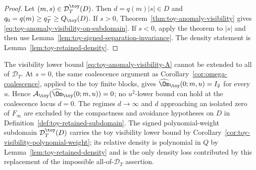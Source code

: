 \begin{proof}
Let \((m,s)\in\mathcal D_T^\toy(D)\).  Then
\(d=q(m)|s|\in D\) and \(q_0=q(m)\ge q_T^-\ge Q_\toy(D)\).  If
\(s>0\), Theorem~\ref{thm:toy-anomaly-visibility} gives
\eqref{eq:toy-anomaly-visibility-on-subdomain}.  If \(s<0\), apply the
theorem to \(|s|\) and then use
Lemma~\ref{lem:toy-signed-separation-invariance}.  The density statement
is Lemma~\ref{lem:toy-retained-density}.
\end{proof}


\begin{remark}
\label{rem:toy-anomaly-no-uniform-extension}
The visibility lower bound \eqref{eq:toy-anomaly-visibility-A} cannot be
extended to all of \(\mathcal D_T\).  At \(s=0\), the same coalescence
argument as Corollary~\ref{cor:omega-coalescence}, applied to the toy
finite blocks, gives \(\widehat\Om_\toy(0;m,u)=I_2\) for every \(u\).
Hence \(\mathcal A_\toy(\widehat\Om_\toy(0;m,u))=0\); no
\(u^2\)-lower bound can hold at the coalescence locus \(d=0\).  The
regimes \(d\to\infty\) and \(d\) approaching an isolated zero of
\(F_\infty\) are excluded by the compactness and avoidance hypotheses on
\(D\) in Definition~\ref{def:toy-retained-subdomain}.  The signed
polynomial-weight subdomain \(\mathcal D_T^\toy(D)\) carries the toy
visibility lower bound by
Corollary~\ref{cor:toy-visibility-polynomial-weight}; its relative
density is polynomial in \(Q\) by Lemma~\ref{lem:toy-retained-density}
and is the only density loss contributed by this replacement of the
impossible all-of-\(\mathcal D_T\) assertion.
\end{remark}

